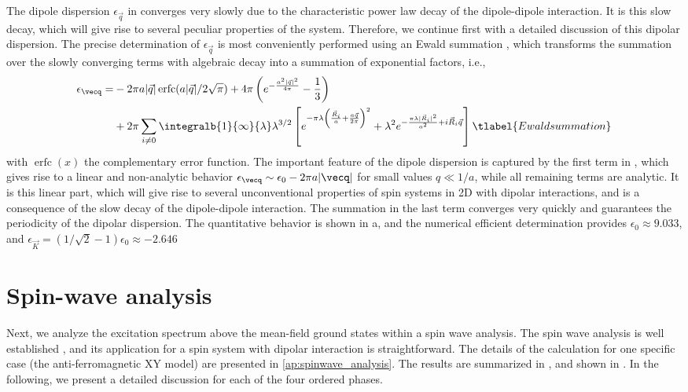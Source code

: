 The dipole dispersion $\epsilon_{\vec q}$ in 
converges very slowly due to the characteristic power law decay of the dipole-dipole
interaction. It is this slow decay, which will give rise to several peculiar
properties of the system. Therefore, we continue first with a detailed discussion
of this dipolar dispersion. The precise determination of $\epsilon_{\vec q}$ is
most conveniently performed using an Ewald summation \cite{Bonsall1977}, which transforms
the summation over the slowly converging terms with algebraic decay into a summation of exponential factors, i.e.,
%
\begin{align}
    \epsilon_\vecq   = &- 2 \pi a | {\vec q}|\operatorname{erfc}(a |{\vec q}|/2\sqrt{\pi})   + 4 \pi \left( e^{- \frac{a^2 |{\vec q}|^2}{4 \pi}} - \frac{1}{3}\right)
\\
   & +     2 \pi \sum_{i\neq 0} \integralb{1}{\infty}{\lambda} \lambda^{3/2} \left[ e^{- \pi  \lambda \left(\frac{ {\vec R}_{i}}{a} + \frac{a {\vec q}}{2 \pi}\right)^2} +\lambda^{2}  e^{- \frac{\pi \lambda |{\vec R}_{i}|^2}{a^2}+ i {\vec R}_{i}{\vec q}}\right]\tlabel{Ewaldsummation}
\end{align}
%
with $\operatorname{erfc}(x)$ the complementary error function. The important feature of the dipole
dispersion is captured by the first term in , which
gives rise to a linear and non-analytic behavior $\epsilon_\vecq \sim
\epsilon_0 - 2 \pi a |\vecq|$ for small values $q \ll 1/a $, while all
remaining terms are analytic. It is this linear part, which will give rise to
several unconventional properties of spin systems in 2D with dipolar
interactions, and is a consequence of the slow decay of the dipole-dipole
interaction. The summation in the last term converges very quickly and
guarantees the periodicity of the dipolar dispersion. The quantitative behavior
is shown in a, and the numerical efficient determination provides
$\epsilon_{0}\approx 9.033$, and $\epsilon_{\vec K}=(1/\sqrt{2}-1) \epsilon_{0}
\approx -2.646$


\section{Spin-wave analysis}

Next, we analyze the excitation spectrum above the mean-field ground states
within a spin wave analysis. The spin wave analysis is well
established \cite{Kubo1952,Auerbach1994}, and its application for a spin system with dipolar
interaction is straightforward. The details of the calculation for one specific case (the
anti-ferromagnetic XY model) are presented in \cref{ap:spinwave_analysis}. The results are
summarized in , and shown in . In the following, we present a detailed
discussion for each of the four ordered phases.




